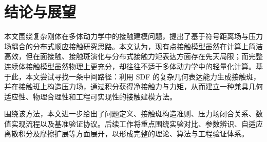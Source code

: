 \section{结论与展望}
本文围绕复杂刚体在多体动力学中的接触建模问题，提出了基于符号距离场与压力场耦合的分布式顺应接触研究思路。本文认为，现有点接触模型虽然在计算上简洁高效，但在面接触、接触斑演化与分布式接触力矩表达方面存在先天局限；而完整连续体接触模型虽然物理上更充分，却往往不适于多体动力学中的轻量化计算。基于此，本文尝试寻找一条中间路径：利用 SDF 的复杂几何表达能力生成接触斑，并在接触斑上构造压力场，通过积分获得净接触力与力矩，从而建立一种兼具几何适应性、物理合理性和工程可实现性的接触建模方法。

围绕该方法，本文进一步给出了问题定义、接触斑构造准则、压力场闭合关系、数值实现流程以及基准验证协议。后续工作将重点围绕实验对比、参数辨识、自适应离散积分及摩擦扩展等方面展开，以形成完整的理论、算法与工程验证体系。
